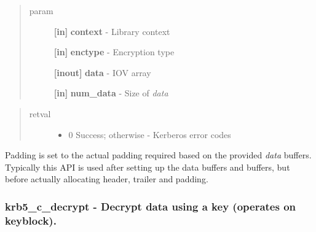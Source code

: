 \documentclass[letterpaper,10pt,english]{sphinxmanual}
\begin{document}
\begin{quote}\begin{description}
\item[{param}] \leavevmode
\textbf{{[}in{]}} \textbf{context} - Library context

\textbf{{[}in{]}} \textbf{enctype} - Encryption type

\textbf{{[}inout{]}} \textbf{data} - IOV array

\textbf{{[}in{]}} \textbf{num\_data} - Size of \emph{data}

\end{description}\end{quote}
\begin{quote}\begin{description}
\item[{retval}] \leavevmode\begin{itemize}
\item {} 
0   Success; otherwise - Kerberos error codes

\end{itemize}

\end{description}\end{quote}

Padding is set to the actual padding required based on the provided \emph{data} buffers. Typically this API is used after setting up the data buffers and {\hyperref[appdev/refs/macros/KRB5_CRYPTO_TYPE_SIGN_ONLY:KRB5_CRYPTO_TYPE_SIGN_ONLY]{}} buffers, but before actually allocating header, trailer and padding.


\subsubsection{krb5\_c\_decrypt -  Decrypt data using a key (operates on keyblock).}
\label{appdev/refs/api/krb5_c_decrypt::doc}\label{appdev/refs/api/krb5_c_decrypt:krb5-c-decrypt-decrypt-data-using-a-key-operates-on-keyblock}

\begin{fulllineitems}
\label{appdev/refs/api/krb5_c_decrypt:c.krb5_c_decrypt}
\end{fulllineitems}
\end{document}
